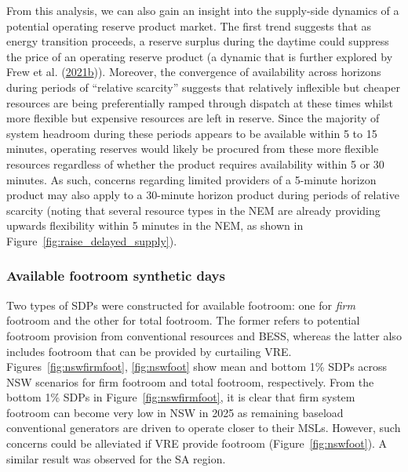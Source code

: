 \documentclass[12pt,a4paper,]{report}
\begin{document}
From this analysis, we can also gain an insight into the supply-side
dynamics of a potential operating reserve product market. The first
trend suggests that as energy transition proceeds, a reserve surplus
during the daytime could suppress the price of an operating reserve
product (a dynamic that is further explored by Frew et al.
(\protect\hyperlink{ref-frewCurtailmentParadoxTransition2021}{2021b})).
Moreover, the convergence of availability across horizons during periods
of ``relative scarcity'' suggests that relatively inflexible but cheaper
resources are being preferentially ramped through dispatch at these
times whilst more flexible but expensive resources are left in reserve.
Since the majority of system headroom during these periods appears to be
available within 5 to 15 minutes, operating reserves would likely be
procured from these more flexible resources regardless of whether the
product requires availability within 5 or 30 minutes. As such, concerns
regarding limited providers of a 5-minute horizon product may also apply
to a 30-minute horizon product during periods of relative scarcity
(noting that several resource types in the NEM are already providing
upwards flexibility within 5 minutes in the NEM, as shown in
Figure~\ref{fig:raise_delayed_supply}).

\hypertarget{sec:reserves-footroomSDPs}{%
\subsubsection{Available footroom synthetic
days}\label{sec:reserves-footroomSDPs}}

Two types of SDPs were constructed for available footroom: one for
\emph{firm} footroom and the other for total footroom. The former refers
to potential footroom provision from conventional resources and BESS,
whereas the latter also includes footroom that can be provided by
curtailing VRE. Figures~\ref{fig:nswfirmfoot}, \ref{fig:nswfoot} show
mean and bottom 1\% SDPs across NSW scenarios for firm footroom and
total footroom, respectively. From the bottom 1\% SDPs in
Figure~\ref{fig:nswfirmfoot}, it is clear that firm system footroom can
become very low in NSW in 2025 as remaining baseload conventional
generators are driven to operate closer to their MSLs. However, such
concerns could be alleviated if VRE provide footroom
(Figure~\ref{fig:nswfoot}). A similar result was observed for the SA
region.
\end{document}
